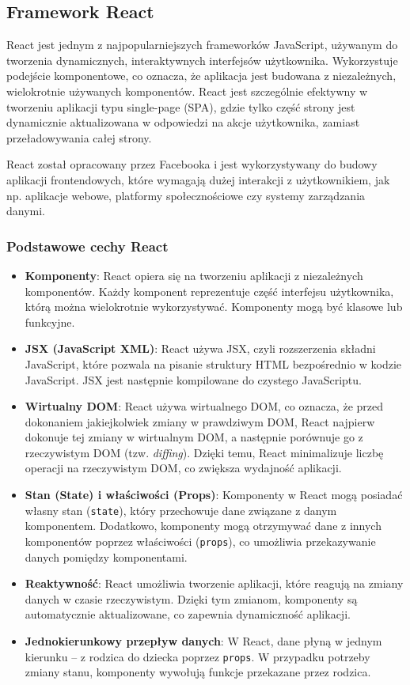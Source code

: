 \subsection{Framework React}

React jest jednym z najpopularniejszych frameworków JavaScript, używanym do tworzenia dynamicznych, interaktywnych interfejsów użytkownika. Wykorzystuje podejście komponentowe, co oznacza, że aplikacja jest budowana z niezależnych, wielokrotnie używanych komponentów. React jest szczególnie efektywny w tworzeniu aplikacji typu single-page (SPA), gdzie tylko część strony jest dynamicznie aktualizowana w odpowiedzi na akcje użytkownika, zamiast przeładowywania całej strony.

React został opracowany przez Facebooka i jest wykorzystywany do budowy aplikacji frontendowych, które wymagają dużej interakcji z użytkownikiem, jak np. aplikacje webowe, platformy społecznościowe czy systemy zarządzania danymi.

\subsubsection{Podstawowe cechy React}

\begin{itemize}
    \item \textbf{Komponenty}: React opiera się na tworzeniu aplikacji z niezależnych komponentów. Każdy komponent reprezentuje część interfejsu użytkownika, którą można wielokrotnie wykorzystywać. Komponenty mogą być klasowe lub funkcyjne.
    \item \textbf{JSX (JavaScript XML)}: React używa JSX, czyli rozszerzenia składni JavaScript, które pozwala na pisanie struktury HTML bezpośrednio w kodzie JavaScript. JSX jest następnie kompilowane do czystego JavaScriptu.
    \item \textbf{Wirtualny DOM}: React używa wirtualnego DOM, co oznacza, że przed dokonaniem jakiejkolwiek zmiany w prawdziwym DOM, React najpierw dokonuje tej zmiany w wirtualnym DOM, a następnie porównuje go z rzeczywistym DOM (tzw. \textit{diffing}). Dzięki temu, React minimalizuje liczbę operacji na rzeczywistym DOM, co zwiększa wydajność aplikacji.
    \item \textbf{Stan (State) i właściwości (Props)}: Komponenty w React mogą posiadać własny stan (\texttt{state}), który przechowuje dane związane z danym komponentem. Dodatkowo, komponenty mogą otrzymywać dane z innych komponentów poprzez właściwości (\texttt{props}), co umożliwia przekazywanie danych pomiędzy komponentami.
    \item \textbf{Reaktywność}: React umożliwia tworzenie aplikacji, które reagują na zmiany danych w czasie rzeczywistym. Dzięki tym zmianom, komponenty są automatycznie aktualizowane, co zapewnia dynamiczność aplikacji.
    \item \textbf{Jednokierunkowy przepływ danych}: W React, dane płyną w jednym kierunku – z rodzica do dziecka poprzez \texttt{props}. W przypadku potrzeby zmiany stanu, komponenty wywołują funkcje przekazane przez rodzica.
\end{itemize}

